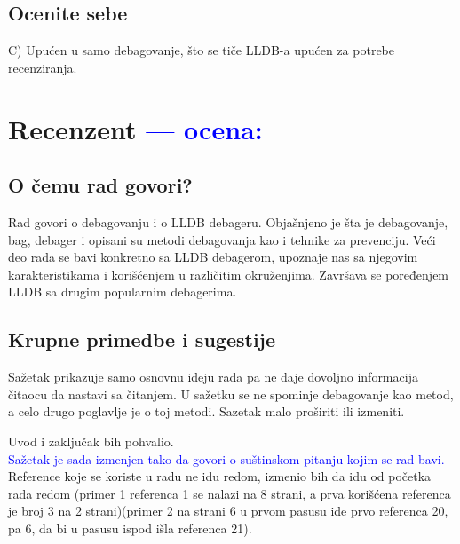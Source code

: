 \documentclass[a4paper]{report}
\newcommand{\odgovor}[1]{\textcolor{blue}{#1}}
\begin{document}
\section{Ocenite sebe}
C) Upućen u samo debagovanje, što se tiče LLDB-a upućen za potrebe recenziranja.

\chapter{Recenzent \odgovor{--- ocena:} }


\section{O čemu rad govori?}
Rad govori o debagovanju i o LLDB debageru. Objašnjeno je šta je debagovanje, bag, debager i opisani su metodi debagovanja kao i tehnike za prevenciju. Veći deo rada se bavi konkretno sa LLDB debagerom, upoznaje nas sa njegovim karakteristikama i korišćenjem u različitim okruženjima. Završava se poređenjem LLDB sa drugim popularnim debagerima.

\section{Krupne primedbe i sugestije} 
\label{section:kpis}
Sažetak prikazuje samo osnovnu ideju rada pa ne daje dovoljno informacija čitaocu da nastavi sa čitanjem. U sažetku se ne spominje debagovanje kao metod, a celo drugo poglavlje je o toj metodi.  Sazetak malo proširiti ili izmeniti.

 Uvod i zaključak bih pohvalio. \\
 \odgovor{Sažetak je sada izmenjen tako da govori o suštinskom pitanju kojim se rad bavi. }
Reference koje se koriste u radu ne idu redom, izmenio bih da idu od početka rada redom (primer 1 referenca 1 se nalazi na 8 strani, a prva korišćena referenca je broj 3 na 2 strani)(primer 2 na strani 6 u prvom pasusu ide prvo referenca 20, pa 6, da bi u pasusu ispod išla referenca 21).
\end{document}
